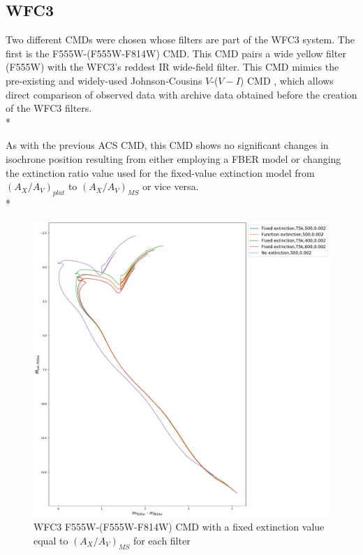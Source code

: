 \documentclass[12pt, a4paper]{report}
\begin{document}
\subsection{WFC3} \label{WFC3_isoc}

Two different CMDs were chosen whose filters are part of the WFC3 system. The first is the F555W-(F555W-F814W) CMD. This CMD pairs a wide yellow filter (F555W) with the WFC3's reddest IR wide-field filter. This CMD mimics the pre-existing and widely-used Johnson-Cousins $V$-($V-I$) CMD \citep{2014wfc..rept...16S}, which allows direct comparison of observed data with archive data obtained before the creation of the WFC3 filters.\\*

As with the previous ACS CMD, this CMD shows no significant changes in isochrone position resulting from either employing a FBER model or changing the extinction ratio value used for the fixed-value extinction model from $(A_{X}/A_{V})_{plat}$ to $(A_{X}/A_{V})_{MS}$ or vice versa.\\*

\begin{figure}[h]
\begin{center}
\includegraphics[width=1.0\textwidth]{../basti_isochrones_10_13Gyr/Extinction_T5k_FeH0fix_func_f555w_f555wmf814w_500_400_600_Myr_FeH_0p002_ref_noext_Av_1p0.pdf}
\caption{WFC3 F555W-(F555W-F814W) CMD with a fixed extinction value equal to $(A_{X}/A_{V})_{MS}$ for each filter}
\label{wfc3_isoc1_T5k}
\end{center}
\end{figure}
\end{document}
